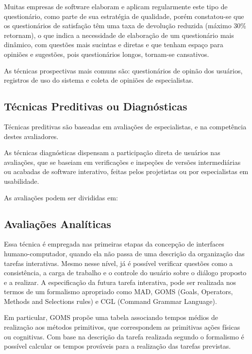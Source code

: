 Muitas empresas de software elaboram e aplicam regularmente este tipo de questionário, como parte de sua estratégia de qualidade, porém constatou-se que os questionários de satisfação têm uma taxa de devolução reduzida (máximo 30\% retornam), o que indica a necessidade de elaboração de um questionário mais dinâmico, com questões mais sucintas e diretas e que tenham espaço para opiniões e sugestões, pois questionários longos, tornam-se cansativos.
\cite{cybil_apostila}

As técnicas prospectivas mais comuns são: questionários de opinão dos usuários, registros de uso do sistema e coleta de opiniões de especialistas. 

\subsection{Técnicas Preditivas ou Diagnósticas}

Técnicas preditivas são baseadas em avaliações de especialistas, e na competência destes avaliadores. 

As técnicas diagnósticas dispensam a participação direta de usuários nas avaliações, que se baseiam em verificações e inspeções de versões intermediárias ou acabadas de software interativo, feitas pelos projetistas ou por especialistas em usabilidade.
\cite{cybil_apostila}

As avaliações podem ser divididas em: 

\subsection{Avaliações Analíticas}

Essa técnica é empregada nas primeiras etapas da concepção de interfaces humano-computador, quando ela não passa de uma descrição da organização das tarefas interativas. Mesmo nesse nível, já é possível verificar questões como a consistência, a carga de trabalho e o controle do usuário sobre o diálogo proposto e a realizar. A especificação da futura tarefa interativa, pode ser realizada nos termos de um formalismo apropriado como MAD, GOMS (Goals, Operators, Methods and Selections rules) e CGL (Command Grammar Language).

Em particular, GOMS propõe uma tabela associando tempos médios de realização aos métodos primitivos, que correspondem as primitivas ações físicas ou cognitivas. Com base na descrição da tarefa realizada segundo o formalismo é possível calcular os tempos prováveis para a realização das tarefas previstas.
\cite{cybil_apostila}

